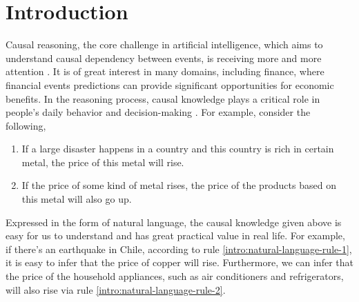 \section{Introduction}
\label{sec:intro}
Causal reasoning, the core challenge in artificial intelligence, which aims to understand causal dependency between events, is receiving more and more attention \cite{Pearl2009}.
It is of great interest in many domains, including finance, where financial events predictions can provide significant opportunities for economic benefits. 
In the reasoning process, causal knowledge plays a critical role in people's daily behavior and decision-making \cite{waldmann2013causal}.
For example, consider the following,
\begin{enumerate}[label=(\alph*)]
	\item If a large disaster happens in a country and this country is rich in certain metal, the price of this metal will rise. \label{intro:natural-language-rule-1}
	\item If the price of some kind of metal rises, the price of the products based on this metal will also go up. \label{intro:natural-language-rule-2}
\end{enumerate}
 Expressed in the form of natural language, the causal knowledge given above is easy for us to understand and has great practical value in real life. For example, if there's an earthquake in Chile, according to rule \ref{intro:natural-language-rule-1}, it is easy to infer that the price of copper will rise. Furthermore, we can infer that the price of the household appliances, such as air conditioners and refrigerators, will also rise via rule \ref{intro:natural-language-rule-2}. 

